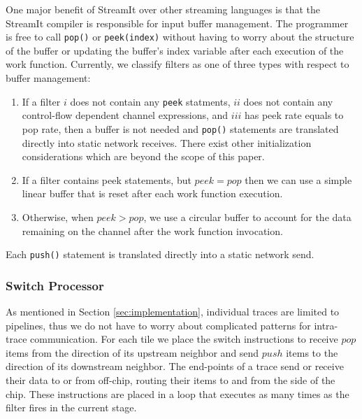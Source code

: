 One major benefit of StreamIt over other streaming languages is that
the StreamIt compiler is responsible for input buffer management.  The
programmer is free to call {\tt pop()} or {\tt peek(index)} without
having to worry about the structure of the buffer or updating the
buffer's index variable after each execution of the work function.
Currently, we classify filters as one of three types with respect to
buffer management: 
\begin{enumerate}
\item If a filter $i$ does not contain any {\tt peek} statments, $ii$
does not contain any control-flow dependent channel expressions, and
$iii$ has peek rate equals to pop rate, then a buffer is not needed
and {\tt pop()} statements are translated directly into static network
receives.  There exist other initialization considerations which are
beyond the scope of this paper.
\item If a filter contains peek statements, but $peek = pop$ then we can
use a simple linear buffer that is reset after each work function execution.
\item Otherwise, when $peek > pop$, we use a circular buffer to
account for the data remaining on the channel after the work function
invocation.
\end{enumerate}
Each {\tt push()} statement is translated directly into a static
network send.  

\subsubsection{Switch Processor}
As mentioned in Section \ref{sec:implementation}, individual traces
are limited to pipelines, thus we do not have to worry about
complicated patterns for intra-trace communication.  For each tile we
place the switch instructions to receive $pop$ items from the
direction of its upstream neighbor and send $push$ items to the
direction of its downstream neighbor.  The end-points of a trace send
or receive their data to or from off-chip, routing their items to and
from the side of the chip. These instructions are placed in a loop
that executes as many times as the filter fires in the current stage.

